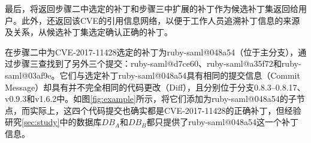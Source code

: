 最后，\tool 将返回步骤二中选定的补丁和步骤三中扩展的补丁作为候选补丁集返回给用户。此外，\tool 还返回该CVE的引用信息网络，以便于工作人员追溯补丁信息的来源及关系，从候选补丁集选定确认正确的补丁。


\begin{exmp}
在步骤二中为CVE-2017-11428选定的补丁为ruby-saml@048a54（位于主分支），\tool 通过步骤三查找到了另外三个提交：ruby-saml@d7ce60\cite{ruby-saml-2}、ruby-saml@a35f72\cite{ruby-saml-3}和ruby-saml@03af9e\cite{ruby-saml-4}。它们与选定补丁ruby-saml@048a54具有相同的提交信息（Commit Message）却具有并不完全相同的代码更改（Diff），且分别位于分支0.8.3--0.8.17、v0.9.3和v1.6.2中。如图\ref{fig:example}所示，\tool 将它们添加为ruby-saml@048a54的子节点，而实际上，这四个代码提交也确实都是CVE-2017-11428的正确补丁，但经验研究\ref{sec:study}中的数据库$DB_A$和$DB_B$都只提供了ruby-saml@048a54这一个补丁信息。
\end{exmp}